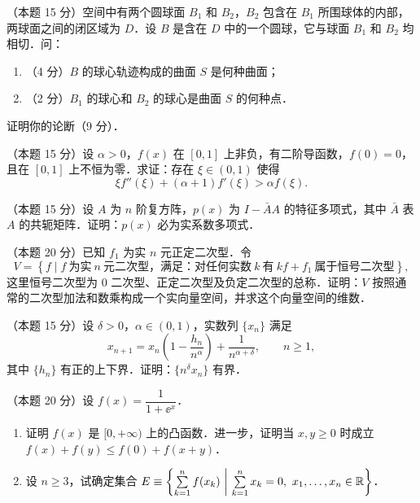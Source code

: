 
\begin{problems}
\item[一、]（本题 15 分）空间中有两个圆球面 $B_1$ 和 $B_2$，$B_2$ 包含在 $B_1$ 所围球体的内部，两球面之间的闭区域为 $D$．设 $B$ 是含在 $D$ 中的一个圆球，它与球面 $B_1$ 和 $B_2$ 均相切．问：
\begin{enumerate}[label=(\roman*)]
  \item（4 分）$B$ 的球心轨迹构成的曲面 $S$ 是何种曲面；
  \item（2 分）$B_1$ 的球心和 $B_2$ 的球心是曲面 $S$ 的何种点．
\end{enumerate}
证明你的论断（9 分）．

\item[二、]（本题 15 分）设 $\alpha>0$，$f(x)$ 在 $[0,1]$ 上非负，有二阶导函数，$f(0)=0$，且在 $[0,1]$ 上不恒为零．求证：存在 $\xi\in(0,1)$ 使得
\[
  \xi f''(\xi)+(\alpha+1)f'(\xi)>\alpha f(\xi).
\]

\item[三、]（本题 15 分）设 $A$ 为 $n$ 阶复方阵，$p(x)$ 为 $I-\bar A A$ 的特征多项式，其中 $\bar A$ 表 $A$ 的共轭矩阵．证明：$p(x)$ 必为实系数多项式．

\item[四、]（本题 20 分）已知 $f_1$ 为实 $n$ 元正定二次型．令
\[
  V=\left\{f\mid f\ \text{为实}\ n\ \text{元二次型，满足：对任何实数}\ k\ \text{有}\ kf+f_1\ \text{属于恒号二次型}\right\},
\]
这里恒号二次型为 $0$ 二次型、正定二次型及负定二次型的总称．证明：$V$ 按照通常的二次型加法和数乘构成一个实向量空间，并求这个向量空间的维数．

\item[五、]（本题 15 分）设 $\delta>0$，$\alpha\in(0,1)$，实数列 $\{x_n\}$ 满足
\[
  x_{n+1}=x_n\left(1-\frac{h_n}{n^{\alpha}}\right)+\frac{1}{n^{\alpha+\delta}},\qquad n\ge1,
\]
其中 $\{h_n\}$ 有正的上下界．证明：$\{n^{\delta}x_n\}$ 有界．

\item[六、]（本题 20 分）设 $f(x)=\dfrac{1}{1+\ee^{x}}$．
\begin{enumerate}[label=(\roman*)]
  \item 证明 $f(x)$ 是 $[0,+\infty)$ 上的凸函数．进一步，证明当 $x,y\ge0$ 时成立 $f(x)+f(y)\le f(0)+f(x+y)$．
  \item 设 $n\ge3$，试确定集合 $E\equiv\left\{\sum\limits_{k=1}^{n}f(x_k)\ \middle|\ \sum\limits_{k=1}^{n}x_k=0,\ x_1,\dots,x_n\in\R\right\}$．
\end{enumerate}
\end{problems}
